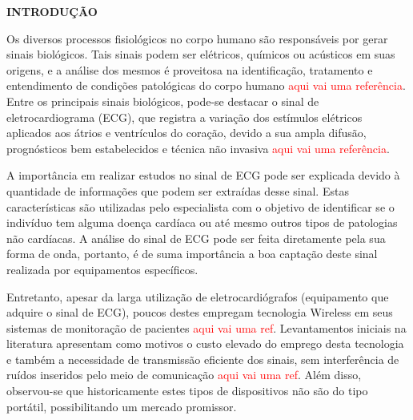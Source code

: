 \documentclass[12pt, a4paper]{article}
\begin{document}
\newpage
\vspace*{4cm}




\setcounter{page}{12}
\begin{center}
\textbf{INTRODUÇÃO\\}
\end{center}
\par
{}	

	Os diversos processos fisiológicos no corpo humano são responsáveis por gerar sinais biológicos. Tais sinais podem ser elétricos, químicos ou acústicos em suas origens, e a análise dos mesmos é proveitosa na identificação, tratamento e entendimento de condições patológicas do corpo humano \textcolor{red}{aqui vai uma referência}. Entre os principais sinais biológicos, pode-se destacar o sinal de eletrocardiograma (ECG), que registra a variação dos estímulos elétricos aplicados aos átrios e ventrículos do coração, devido a sua ampla difusão, prognósticos bem estabelecidos e técnica não invasiva \textcolor{red}{aqui vai uma referência}.

	A importância em realizar estudos no sinal de ECG pode ser explicada devido à quantidade de informações que podem ser extraídas desse sinal. Estas características são utilizadas pelo especialista com o objetivo de identificar se o indivíduo tem alguma doença cardíaca ou até mesmo outros tipos de patologias não cardíacas. A análise do sinal de ECG pode ser feita diretamente pela sua forma de onda, portanto, é de suma importância a boa captação deste sinal realizada por equipamentos específicos. 

	Entretanto, apesar da larga utilização de eletrocardiógrafos (equipamento que adquire o sinal de ECG), poucos destes empregam tecnologia Wireless em seus sistemas de monitoração de pacientes \textcolor{red}{aqui vai uma ref}. Levantamentos iniciais na literatura apresentam como motivos o custo elevado do emprego desta tecnologia e também a necessidade de transmissão eficiente dos sinais, sem interferência de ruídos inseridos pelo meio de comunicação \textcolor{red}{aqui vai uma ref}. Além disso, observou-se que historicamente estes tipos de dispositivos não são do tipo portátil, possibilitando um mercado promissor. 
    
\end{document}
